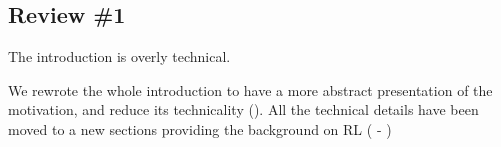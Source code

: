 \subsection{Review \#1}



\begin{remark} \label{rem:intro}
The introduction is overly technical.
\end{remark}
\begin{solved}
We rewrote the whole introduction to have a more abstract presentation of the motivation, and reduce its technicality (). All the technical details have been moved to a new sections providing the background on \ac{RL} ( - )  
\end{solved}



\endinput

